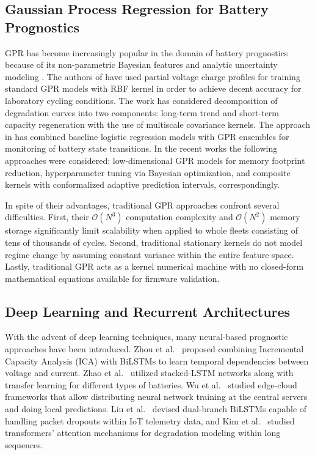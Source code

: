 \documentclass[a4paper,fleqn]{cas-sc}
\begin{document}
\subsection{Gaussian Process Regression for Battery Prognostics}
GPR has become increasingly popular in the domain of battery prognostics because of its non-parametric Bayesian features and analytic uncertainty modeling \cite{he2011prognostics, xing2013ensemble}. The authors of \cite{liu2018novel} have used partial voltage charge profiles for training standard GPR models with RBF kernel in order to achieve decent accuracy for laboratory cycling conditions. The work \cite{richardson2019multiscale} has considered decomposition of degradation curves into two components: long-term trend and short-term capacity regeneration with the use of multiscale covariance kernels. The approach in \cite{yang2018multiscale} has combined baseline logistic regression models with GPR ensembles for monitoring of battery state transitions. In the recent works \cite{li2024lowdim, wang2024bayesian, alvarez2026uncertainty} the following approaches were considered: low-dimensional GPR models for memory footprint reduction, hyperparameter tuning via Bayesian optimization, and composite kernels with conformalized adaptive prediction intervals, correspondingly.

In spite of their advantages, traditional GPR approaches confront several difficulties. First, their $\mathcal{O}(N^3)$ computation complexity and $\mathcal{O}(N^2)$ memory storage significantly limit scalability when applied to whole fleets consisting of tens of thousands of cycles. Second, traditional stationary kernels do not model regime change by assuming constant variance within the entire feature space. Lastly, traditional GPR acts as a kernel numerical machine with no closed-form mathematical equations available for firmware validation.

\subsection{Deep Learning and Recurrent Architectures}
With the advent of deep learning techniques, many neural-based prognostic approaches have been introduced. Zhou et al.~\cite{zhou2023bilstm} proposed combining Incremental Capacity Analysis (ICA) with BiLSTMs to learn temporal dependencies between voltage and current. Zhao et al.~\cite{zhao2024stacked} utilized stacked-LSTM networks along with transfer learning for different types of batteries. Wu et al.~\cite{wu2024endcloud} studied edge-cloud frameworks that allow distributing neural network training at the central servers and doing local predictions. Liu et al.~\cite{liu2026dualbranch} devised dual-branch BiLSTMs capable of handling packet dropouts within IoT telemetry data, and Kim et al.~\cite{kim2026uncertainty} studied transformers' attention mechanisms for degradation modeling within long sequences.
\end{document}
